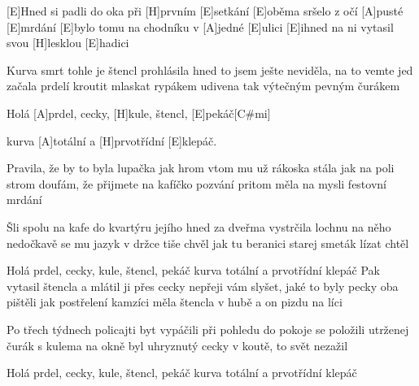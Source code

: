 
[E]Hned si padli do oka při [H]prvním [E]setkání
[E]oběma sršelo z očí [A]pusté [E]mrdání
[E]bylo tomu na chodníku v [A]jedné [E]ulici
[E]ihned na ni vytasil svou [H]lesklou [E]hadici

Kurva smrt tohle je štencl prohlásila hned
to jsem ješte neviděla, na to vemte jed
začala prdelí kroutit mlaskat rypákem
udivena tak výtečným pevným čurákem

Holá [A]prdel, cecky, [H]kule, štencl, [E]pekáč[C#mi]

kurva [A]totální a [H]prvotřídní [E]klepáč.

\begin{multicols}{2}
Pravila, že by to byla lupačka jak hrom
vtom mu už rákoska stála jak na poli strom
doufám, že přijmete na kafíčko pozvání
pritom měla na mysli festovní mrdání

Šli spolu na kafe do kvartýru jejího
hned za dveřma vystrčila lochnu na něho
nedočkavě se mu jazyk v držce tiše chvěl
jak tu beranici starej smeták lízat chtěl

Holá prdel, cecky, kule, štencl, pekáč
kurva totální a prvotřídní klepáč
\columnbreak
Pak vytasil štencla a mlátil ji přes cecky
nepřeji vám slyšet, jaké to byly pecky
oba pištěli jak postřelení kamzíci
měla štencla v hubě a on pizdu na líci

Po třech týdnech policajti byt vypáčili
při pohledu do pokoje se položili
utrženej čurák s kulema na okně byl
uhryznutý cecky v koutě, to svět nezažil

Holá prdel, cecky, kule, štencl, pekáč
kurva totální a prvotřídní klepáč
\end{multicols}